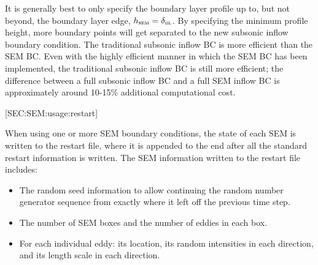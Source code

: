 \begin{itemize}
    It is generally best to only specify the boundary layer profile up to, but
    not beyond, the boundary layer edge, \thatis $h_{\textsc{sem}} = \delta_{\textsc{bl}}$.
    By specifying the minimum profile height, more boundary points will get
    separated to the new subsonic inflow boundary condition.
    The traditional subsonic inflow BC is more efficient than the SEM BC.
    Even with the highly efficient manner in which the SEM BC has been
    implemented, the traditional subsonic inflow BC is still more efficient; the
    difference between a full subsonic inflow BC and a full SEM inflow BC is
    approximately around 10-15\% additional computational cost.
\end{itemize}


[SEC:SEM:usage:restart]

When using one or more SEM boundary conditions, the state of each SEM is
written to the restart file, where it is appended to the end after all the
standard restart information is written.
%
The SEM information written to the restart file includes:
%
\begin{itemize}
  \item The random seed information to allow continuing the random number
    generator sequence from exactly where it left off the previous time step.
  \item The number of SEM boxes and the number of eddies in each box.
  \item For each individual eddy: its location, its random intensities in each
    direction, and its length scale in each direction.
\end{itemize}


